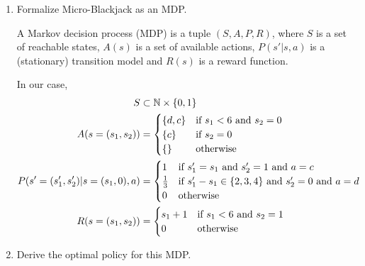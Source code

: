 \documentclass[11pt, a4paper]{article}
\begin{document}
\begin{enumerate}
    \item Formalize Micro-Blackjack as an MDP.

    \begin{solution}
        A Markov decision process (MDP) is a tuple $(S, A, P, R)$, where $S$ is a set of reachable states, $A(s)$ is a set of available actions, $P(s' | s, a)$ is a (stationary) transition model and $R(s)$ is a reward function.

        In our case,
        \begin{align*}
            S & \subset \mathbb{N} \times \{0, 1\} \\
            A(s = (s_1, s_2)) & = \begin{cases}
                \{d, c\} & \text{if } s_1 < 6 \text{ and } s_2 = 0 \\
                \{c\} & \text{if } s_2 = 0 \\
                \{\} & \text{otherwise}
            \end{cases} \\
            P(s' = (s_1', s_2') | s = (s_1, 0), a) & = \begin{cases}
                1 & \text{if } s_1' = s_1 \text{ and } s_2' = 1 \text{ and } a = c \\
                \frac{1}{3} & \text{if } s_1' - s_1 \in \{2, 3, 4\} \text{ and } s_2' = 0 \text{ and } a = d \\
                0 & \text{otherwise}
            \end{cases} \\
            R(s = (s_1, s_2)) & = \begin{cases}
                s_1 + 1 & \text{if } s_1 < 6 \text{ and } s_2 = 1 \\
                0 & \text{otherwise}
            \end{cases}
        \end{align*}
    \end{solution}

    \item Derive the optimal policy for this MDP.


\end{enumerate}
\end{document}
